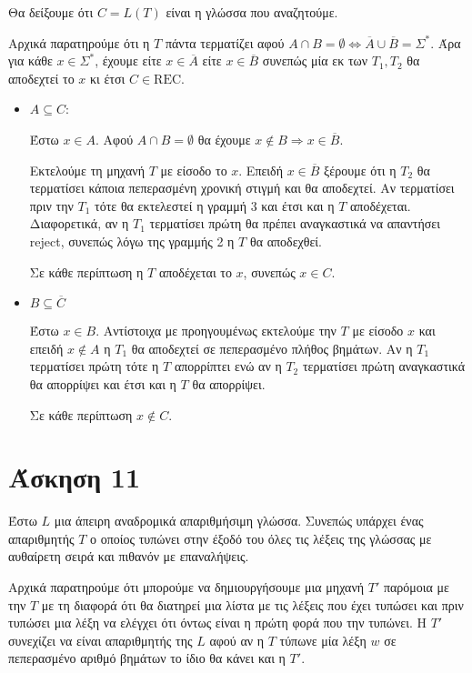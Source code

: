 \documentclass[a4paper, oneside, 11pt]{article}
\theoremstyle{definition}
\begin{document}
Θα δείξουμε ότι $C = L(T)$ είναι η γλώσσα που αναζητούμε.

Αρχικά παρατηρούμε ότι η $T$ πάντα τερματίζει αφού $A \cap B = \emptyset
\Leftrightarrow \overline{A} \cup \overline{B} = \Sigma^*$. Άρα για κάθε $x \in
\Sigma^*$, έχουμε είτε $x \in \overline{A}$ είτε $x \in \overline{B}$ συνεπώς μία εκ
των $T_1, T_2$ θα αποδεχτεί το $x$ κι έτσι $C \in \text{REC}$.

\begin{itemize}
\item $A \subseteq C$:
      
      Έστω $x \in A$. Αφού $A \cap B = \emptyset$ θα έχουμε $x \notin B
      \Rightarrow x \in \overline{B}$.

      Εκτελούμε τη μηχανή $T$ με είσοδο το $x$. Επειδή $x \in \overline{B}$ ξέρουμε
      ότι η $T_2$ θα τερματίσει κάποια πεπερασμένη χρονική στιγμή και θα αποδεχτεί.
      Αν τερματίσει πριν την $T_1$ τότε θα εκτελεστεί η γραμμή 3 και έτσι και η $T$
      αποδέχεται. Διαφορετικά, αν η $T_1$ τερματίσει πρώτη θα
      πρέπει αναγκαστικά να απαντήσει reject, συνεπώς λόγω της γραμμής 2 η $T$ θα
      αποδεχθεί.

      Σε κάθε περίπτωση η $T$ αποδέχεται το $x$, συνεπώς $x \in C$.

\item $B \subseteq \overline{C}$

      Έστω $x \in B$. Αντίστοιχα με προηγουμένως εκτελούμε την $T$ με είσοδο $x$ και
      επειδή $x \notin A$ η $T_1$ θα αποδεχτεί σε πεπερασμένο πλήθος βημάτων. Αν η
      $T_1$ τερματίσει πρώτη τότε η $T$ απορρίπτει ενώ αν η $T_2$ τερματίσει πρώτη
      αναγκαστικά θα απορρίψει και έτσι και η $T$ θα απορρίψει.

      Σε κάθε περίπτωση $x \notin C$.
\end{itemize}

\section*{Άσκηση 11}

Έστω $L$ μια άπειρη αναδρομικά απαριθμήσιμη γλώσσα. Συνεπώς υπάρχει ένας απαριθμητής
$T$ ο οποίος τυπώνει στην έξοδό του όλες τις λέξεις της γλώσσας με αυθαίρετη σειρά
και πιθανόν με επαναλήψεις.

Αρχικά παρατηρούμε ότι μπορούμε να δημιουργήσουμε μια μηχανή $T'$ παρόμοια με την $T$
με τη διαφορά ότι θα διατηρεί μια λίστα με τις λέξεις που έχει τυπώσει και πριν
τυπώσει μια λέξη να ελέγχει ότι όντως είναι η πρώτη φορά που την τυπώνει. H $T'$
συνεχίζει να είναι απαριθμητής της $L$ αφού αν η $T$ τύπωνε μία λέξη $w$ σε
πεπερασμένο αριθμό βημάτων το ίδιο θα κάνει και η $T'$.
\end{document}

